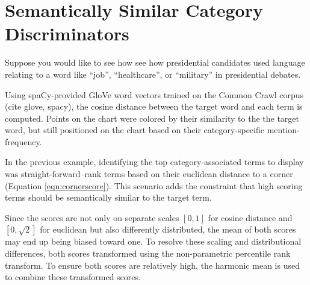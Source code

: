 \documentclass[11pt]{article}
\begin{document}
\section{Semantically Similar Category Discriminators}
\label{embeddings}

Suppose you would like to see how see how presidential candidates used language relating to a word like ``job'', ``healthcare'', or ``military'' in presidential debates.  

Using spaCy-provided GloVe \cite{glove} word vectors trained on the Common Crawl corpus (cite glove, spacy), the cosine distance between the target word and each term is computed.  Points on the chart were colored by their similarity to the the target word, but still positioned on the chart based on their category-specific mention-frequency.

In the previous example, identifying the top category-associated terms to display was straight-forward--rank terms based on their euclidean distance to a corner (Equation \ref{eqn:cornerscore}).  This scenario adds the constraint that high scoring terms should be semantically similar to the target term. 

Since the scores are not only on separate scales $[0,1]$ for cosine distance and $[0, \sqrt{2}]$ for euclidean but also differently distributed, the mean of both scores may end up being biased toward one.  To resolve these scaling and distributional differences, both scores transformed using the non-parametric percentile rank transform.  To ensure both scores are relatively high, the harmonic mean is used to combine these transformed scores.

\nocite{ggplot2}
\nocite{Rudder2014}
\nocite{tidytext}


\end{document}
